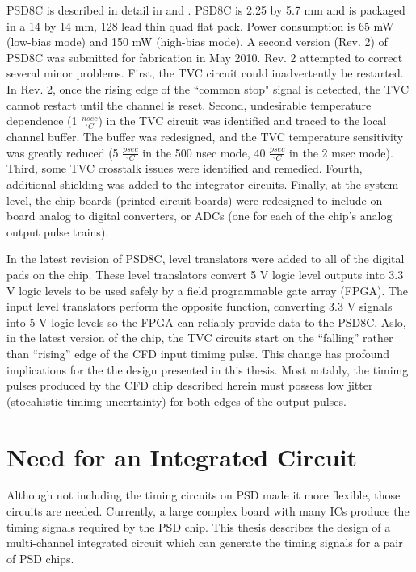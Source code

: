 \documentclass[12pt,oneside,final]{siuethesis}
\theoremstyle{definition}
\begin{document}
PSD8C is described in detail in \cite{PROCTOR} and \cite{HALL}. PSD8C is 2.25 by 5.7 mm and is packaged in a 14 by 14 mm, 128 lead thin quad flat pack. Power consumption is 65 mW (low-bias mode) and 150 mW (high-bias mode).
A second version (Rev. 2) of PSD8C was submitted for fabrication in May 2010. Rev. 2 attempted to correct several minor
problems. First, the TVC circuit could inadvertently be restarted. In Rev. 2, once the rising edge of the ``common stop" signal is detected, the TVC cannot restart until the channel is reset. Second, undesirable temperature dependence (1 $\frac{nsec}{^{\circ}C}$) in the TVC circuit was identified and traced to the local channel buffer. The buffer was redesigned, and the TVC temperature sensitivity was greatly reduced (5 $\frac{psec}{^{\circ}C}$ in the 500 nsec mode, 40 $\frac{psec}{^{\circ}C}$ in the 2 msec mode). Third, some TVC crosstalk issues were identified and remedied. Fourth, additional shielding was added to the integrator circuits. Finally, at the system level, the chip-boards (printed-circuit boards) were redesigned to include on-board analog to digital converters, or ADCs (one for each of the chip's analog output pulse trains).
\par In the latest revision of PSD8C, level translators were added to all of the digital pads on the chip. These level translators convert 5 V logic level outputs into 3.3 V logic levels to be used safely by a field programmable gate array (FPGA). The input level translators perform the opposite function, converting 3.3 V signals into 5 V logic levels so the FPGA can reliably provide data to the PSD8C. Aslo, in the latest version of the chip, the TVC circuits start on the ``falling'' rather than ``rising'' edge of the CFD input timimg pulse.  This change has profound implications for the the design presented in this thesis.  Most notably, the timimg pulses produced by the CFD chip described herein must possess low jitter (stocahistic timimg uncertainty) for both edges of the output pulses.

\section{Need for an Integrated Circuit}

Although not including the timing circuits on PSD made it more flexible, those circuits are needed.  Currently, a large complex board with many ICs produce the timing signals required by the PSD chip. This thesis describes the design of a multi-channel integrated circuit which can generate the timing signals for a pair of PSD chips.
\end{document}
